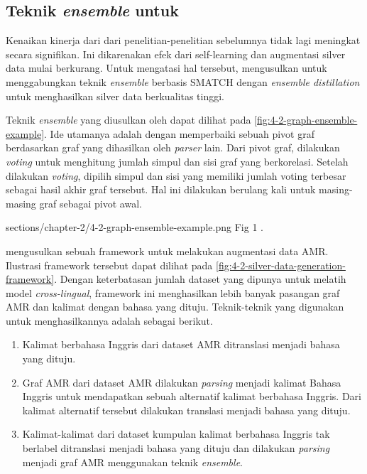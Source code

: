 \subsection{Teknik \textit{ensemble} untuk \amrparsing{}}

Kenaikan kinerja dari \amrparsing{} dari penelitian-penelitian sebelumnya tidak lagi meningkat secara signifikan.
Ini dikarenakan efek dari self-learning dan augmentasi silver data mulai berkurang.
Untuk mengatasi hal tersebut, \textcite{lee2022} mengusulkan untuk menggabungkan teknik \textit{ensemble} berbasis \gls{SMATCH}  dengan \textit{ensemble distillation} untuk menghasilkan silver data berkualitas tinggi.

Teknik \textit{ensemble} yang diusulkan oleh \textcite{hoang2021} dapat dilihat pada \cref{fig:4-2-graph-ensemble-example}.
Ide utamanya adalah dengan memperbaiki sebuah pivot graf berdasarkan graf yang dihasilkan oleh \textit{parser} lain.
Dari pivot graf, dilakukan \textit{voting} untuk menghitung jumlah simpul dan sisi graf yang berkorelasi.
Setelah dilakukan \textit{voting}, dipilih simpul dan sisi yang memiliki jumlah voting terbesar sebagai hasil akhir graf tersebut.
Hal ini dilakukan berulang kali untuk masing-masing graf sebagai pivot awal.

  {sections/chapter-2/4-2-graph-ensemble-example.png}
  {Fig 1 .}

\textcite{lee2022} mengusulkan sebuah framework untuk melakukan augmentasi data \gls{AMR}.
Ilustrasi framework tersebut dapat dilihat pada \cref{fig:4-2-silver-data-generation-framework}.
Dengan keterbatasan jumlah dataset yang dipunya untuk melatih model \textit{cross-lingual}, framework ini menghasilkan lebih banyak pasangan graf \gls{AMR} dan kalimat dengan bahasa yang dituju.
Teknik-teknik yang digunakan untuk menghasilkannya adalah sebagai berikut.
\begin{enumerate}
  \item Kalimat berbahasa Inggris dari dataset \gls{AMR} ditranslasi menjadi bahasa yang dituju.

  \item Graf \gls{AMR} dari dataset \gls{AMR} dilakukan \textit{parsing} menjadi kalimat Bahasa Inggris untuk mendapatkan sebuah alternatif kalimat berbahasa Inggris.
  Dari kalimat alternatif tersebut dilakukan translasi menjadi bahasa yang dituju.

  \item Kalimat-kalimat dari dataset kumpulan kalimat berbahasa Inggris tak berlabel ditranslasi menjadi bahasa yang dituju dan dilakukan \textit{parsing} menjadi graf \gls{AMR} menggunakan teknik \textit{ensemble}.
\end{enumerate}

